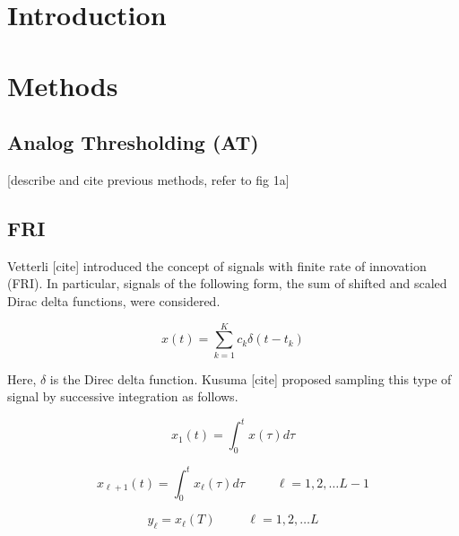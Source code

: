 \documentclass[journal]{IEEEtran}
\begin{document}
\section{Introduction}




\section{Methods}

\subsection{Analog Thresholding (AT)}

[describe and cite previous methods, refer to fig 1a]

\subsection{FRI}

Vetterli [cite] introduced the concept of signals with finite rate of innovation (FRI). In particular, signals of the following form, the sum of shifted and scaled Dirac delta functions, were considered.

\begin{equation}
x(t) = \sum_{k=1}^K c_k \delta(t - t_k)
\end{equation}

Here, $\delta$ is the Direc delta function. Kusuma [cite] proposed sampling this type of signal by successive integration as follows.

\begin{equation}
x_1(t) = \int_0^t x(\tau) d\tau
\end{equation}

\begin{equation}
x_{\ell+1}(t) = \int_0^t x_{\ell}(\tau) d\tau \hspace{30pt} \ell = 1, 2, \ldots L-1
\end{equation}

\begin{equation}
y_\ell = x_\ell(T) \hspace{30pt} \ell = 1, 2, \ldots L
\end{equation}
\end{document}
